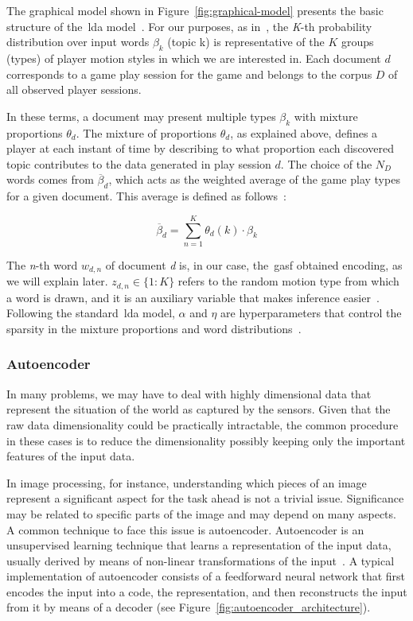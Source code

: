 The graphical model shown in Figure~\ref{fig:graphical-model} presents the basic structure of the~\gls{lda} model~\citep{blei_latent_2003}. For our purposes, as in~\cite{smith_mining_2016}, the \textit{K}-th probability distribution over input words $\beta_{k}$ (topic k) is representative of the $K$ groups (types) of player motion styles in which we are interested in. Each document $d$ corresponds to a game play session for the game and belongs to the corpus $D$ of all observed player sessions.

In these terms, a document may present multiple types $\beta_{k}$ with mixture proportions $\theta_{d}$. The mixture of proportions $\theta_{d}$, as explained above, defines a player at each instant of time by describing to what proportion each discovered topic contributes to the data generated in play session $d$. The choice of the $N_{D}$ words comes from $\overline{\beta}_{d}$, which acts as the weighted average of the game play types for a given document. This average is defined as follows~\citep{blei_latent_2003,smith_mining_2016}:

\begin{equation}
\overline{\beta}_{d} = \sum_{n=1}^{K} \theta_{d}(k) \cdot \beta_{k}
\end{equation}

The \textit{n}-th word $w_{d,n}$ of document \textit{d} is, in our case, the~\gls{gasf} obtained encoding, as we will explain later. $z_{d,n} \in \{1:K\}$ refers to the random motion type from which a word is drawn, and it is an auxiliary variable that makes inference easier~\citep{blei_latent_2003}. Following the standard~\gls{lda} model, $\alpha$ and $\eta$ are hyperparameters that control the sparsity in the mixture proportions and word distributions~\citep{smith_mining_2016}.

\subsubsection{Autoencoder}\label{sec:autoencoder}

In many problems, we may have to deal with highly dimensional data that represent the situation of the world as captured by the sensors. Given that the raw data dimensionality could be practically intractable, the common procedure in these cases is to reduce the dimensionality possibly keeping only the important features of the input data.

In image processing, for instance, understanding which pieces of an image represent a significant aspect for the task ahead is not a trivial issue. Significance may be related to specific parts of the image and may depend on many aspects. A common technique to face this issue is autoencoder.
Autoencoder is an unsupervised learning technique that learns a representation of the input data, usually derived by means of non-linear transformations of the input~\citep{goodfellow_deep_2016}. A typical implementation of autoencoder consists of a feedforward neural network that first encodes the input into a code, the representation, and then reconstructs the input from it by means of a decoder (see Figure~\ref{fig:autoencoder_architecture}).

